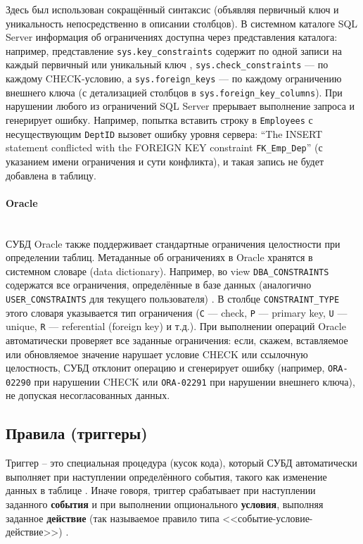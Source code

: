  Здесь был использован сокращённый синтаксис (объявляя первичный ключ и уникальность непосредственно в описании столбцов). В системном каталоге SQL Server информация об ограничениях доступна через представления каталога: например, представление \texttt{sys.key\_constraints} содержит по одной записи на каждый первичный или уникальный ключ \autocite{msSysKeyConstraints}, \texttt{sys.check\_constraints} — по каждому CHECK-условию, а \texttt{sys.foreign\_keys} — по каждому ограничению внешнего ключа (с детализацией столбцов в \texttt{sys.foreign\_key\_columns}). При нарушении любого из ограничений SQL Server прерывает выполнение запроса и генерирует ошибку. Например, попытка вставить строку в \texttt{Employees} с несуществующим \texttt{DeptID} вызовет ошибку уровня сервера: \enquote{The INSERT statement conflicted with the FOREIGN KEY constraint \texttt{FK\_Emp\_Dep}} (с указанием имени ограничения и сути конфликта), и такая запись не будет добавлена в таблицу. 

\paragraph{Oracle} ~\\

 СУБД Oracle также поддерживает стандартные ограничения целостности при определении таблиц. Метаданные об ограничениях в Oracle хранятся в системном словаре (data dictionary). Например, во view \texttt{DBA\_CONSTRAINTS} содержатся все ограничения, определённые в базе данных (аналогично \texttt{USER\_CONSTRAINTS} для текущего пользователя) \autocite[§4.216]{oracledbdoc1}. В столбце \texttt{CONSTRAINT\_TYPE} этого словаря указывается тип ограничения (\texttt{C} — check, \texttt{P} — primary key, \texttt{U} — unique, \texttt{R} — referential (foreign key) и т.д.). При выполнении операций Oracle автоматически проверяет все заданные ограничения: если, скажем, вставляемое или обновляемое значение нарушает условие CHECK или ссылочную целостность, СУБД отклонит операцию и сгенерирует ошибку (например, \texttt{ORA-02290} при нарушении CHECK или \texttt{ORA-02291} при нарушении внешнего ключа), не допуская несогласованных данных.

\subsection{Правила (триггеры)}

 Триггер – это специальная процедура (кусок кода), который СУБД автоматически выполняет при наступлении определённого события, такого как изменение данных в таблице \autocite{Silberschatz}. Иначе говоря, триггер срабатывает при наступлении заданного \textbf{события} и при выполнении опционального \textbf{условия}, выполняя заданное \textbf{действие} (так называемое правило типа <<событие-условие-действие>>) \autocite{ElmasriNavathe}. 
 
